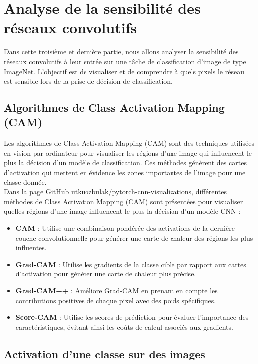 \section{Analyse de la sensibilité des réseaux convolutifs}

Dans cette troisième et dernière partie, nous allons analyser la sensibilité des réseaux convolutifs à leur entrée sur une tâche de classification d’image de type ImageNet. L’objectif est de visualiser et de comprendre à quels pixels le réseau est sensible lors de la prise de décision de classification.

\subsection{Algorithmes de Class Activation Mapping (CAM)}

Les algorithmes de Class Activation Mapping (CAM) sont des techniques utilisées en vision par ordinateur pour visualiser les régions d'une image qui influencent le plus la décision d'un modèle de classification. Ces méthodes génèrent des cartes d'activation qui mettent en évidence les zones importantes de l'image pour une classe donnée.\\

Dans la page GitHub \href{https://github.com/utkuozbulak/pytorch-cnn-visualizations}{utkuozbulak/pytorch-cnn-visualizations}, différentes méthodes de Class Activation Mapping (CAM) sont présentées pour visualiser quelles régions d'une image influencent le plus la décision d'un modèle CNN :

\begin{itemize}
    \item \textbf{CAM} : Utilise une combinaison pondérée des activations de la dernière couche convolutionnelle pour générer une carte de chaleur des régions les plus influentes.
    \item \textbf{Grad-CAM} : Utilise les gradients de la classe cible par rapport aux cartes d'activation pour générer une carte de chaleur plus précise.
    \item \textbf{Grad-CAM++} : Améliore Grad-CAM en prenant en compte les contributions positives de chaque pixel avec des poids spécifiques.
    \item \textbf{Score-CAM} : Utilise les scores de prédiction pour évaluer l'importance des caractéristiques, évitant ainsi les coûts de calcul associés aux gradients.
\end{itemize}

\subsection{Activation d'une classe sur des images}

